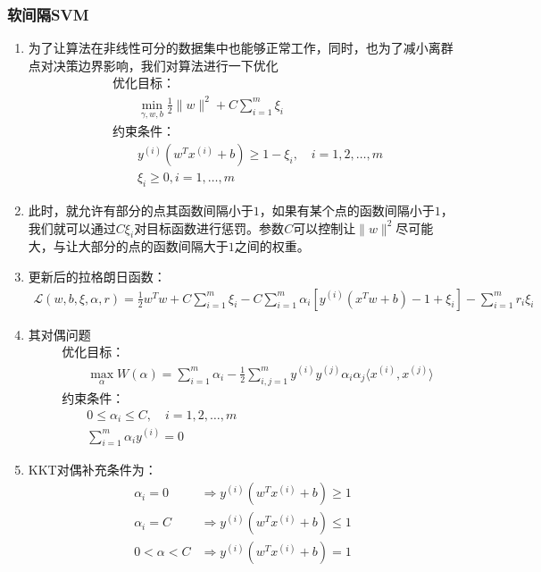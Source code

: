 \subsubsection{软间隔SVM}
\begin{enumerate}
	\item 为了让算法在非线性可分的数据集中也能够正常工作，同时，也为了减小离群点对决策边界影响，我们对算法进行一下优化
	\begin{align}
		&\text{优化目标：} \\
		& \qquad \min_{\gamma, w, b} \frac{1}{2}\|w\|^2 + C\sum_{i=1}^{m}\xi_i \\
		&\text{约束条件：} \\
		& \qquad y^{(i)}(w^Tx^{(i)} + b) \geq 1-\xi_i, \quad i=1, 2, \dots, m \\
		& \qquad \xi_i \geq 0, i=1,\dots,m
	\end{align}
	\item 此时，就允许有部分的点其函数间隔小于$1$，如果有某个点的函数间隔小于$1$，我们就可以通过$C\xi_i$对目标函数进行惩罚。参数$C$可以控制让$\|w\|^2$尽可能大，与让大部分的点的函数间隔大于$1$之间的权重。
	\item 更新后的拉格朗日函数：
	\begin{align}
		\mathcal{L}(w,b,\xi,\alpha,r) = \frac{1}{2}w^Tw + C\sum_{i=1}^{m}\xi_i -C\sum_{i=1}^{m}\alpha_i\left[y^{(i)}(x^Tw + b)-1+\xi_i\right]-\sum_{i=1}^{m}r_i\xi_i
	\end{align}
	\item 其对偶问题
	\begin{align}
		&\text{优化目标：} \\
		& \qquad \max_{\alpha}W(\alpha)=\sum_{i=1}^{m} \alpha_i -\frac{1}{2}\sum_{i,j=1}^{m}y^{(i)}y^{(j)}\alpha_i\alpha_j\langle x^{(i)},x^{(j)} \rangle \\
		&\text{约束条件：} \\
		& \qquad 0 \leq \alpha_i \leq C, \quad i=1, 2, \dots, m \\
		& \qquad \sum_{i=1}^{m}\alpha_i y^{(i)} = 0
	\end{align}
	\item KKT对偶补充条件为：
	\begin{align}
		\alpha_i = 0 &\Rightarrow y^{(i)}(w^Tx^{(i)}+b) \geq 1\\
		\alpha_i = C &\Rightarrow y^{(i)}(w^Tx^{(i)}+b) \leq 1\\
		0 < \alpha < C &\Rightarrow y^{(i)}(w^Tx^{(i)}+b) = 1\\
	\end{align}

\end{enumerate}















